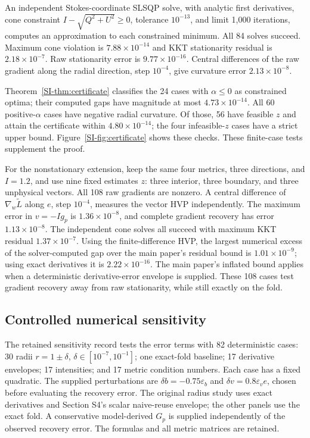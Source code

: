 An independent Stokes-coordinate SLSQP solve, with analytic first derivatives, cone constraint $I-\sqrt{Q^2+U^2}\geq0$, tolerance $10^{-13}$, and limit 1,000 iterations, computes an approximation to each constrained minimum. All 84 solves succeed. Maximum cone violation is $7.88\times10^{-14}$ and KKT stationarity residual is $2.18\times10^{-7}$. Raw stationarity error is $9.77\times10^{-16}$. Central differences of the raw gradient along the radial direction, step $10^{-4}$, give curvature error $2.13\times10^{-8}$.

Theorem~\ref{SI-thm:certificate} classifies the 24 cases with $\alpha\leq0$ as constrained optima; their computed gaps have magnitude at most $4.73\times10^{-14}$. All 60 positive-$\alpha$ cases have negative radial curvature. Of those, 56 have feasible $z$ and attain the certificate within $4.80\times10^{-14}$; the four infeasible-$z$ cases have a strict upper bound. Figure~\ref{SI-fig:certificate} shows these checks. These finite-case tests supplement the proof.

For the nonstationary extension, keep the same four metrics, three directions, and $I=1.2$, and use nine fixed estimates $z$: three interior, three boundary, and three unphysical vectors. All 108 raw gradients are nonzero. A central difference of $\nabla_w\widetilde L$ along $e$, step $10^{-4}$, measures the vector HVP independently. The maximum error in $v=-Ig_p$ is $1.36\times10^{-8}$, and complete gradient recovery has error $1.13\times10^{-8}$. The independent cone solves all succeed with maximum KKT residual $1.37\times10^{-7}$. Using the finite-difference HVP, the largest numerical excess of the solver-computed gap over the main paper's residual bound is $1.01\times10^{-9}$; using exact derivatives it is $2.22\times10^{-16}$. The main paper's inflated bound applies when a deterministic derivative-error envelope is supplied. These 108 cases test gradient recovery away from raw stationarity, while still exactly on the fold.




\subsection{Controlled numerical sensitivity}
The retained sensitivity record tests the error terms with 82 deterministic cases: 30 radii $r=1\pm\delta$, $\delta\in[10^{-7},10^{-1}]$; one exact-fold baseline; 17 derivative envelopes; 17 intensities; and 17 metric condition numbers. Each case has a fixed quadratic. The supplied perturbations are $\delta b=-0.75\varepsilon_b$ and $\delta v=0.8\varepsilon_ve$, chosen before evaluating the recovery error. The original radius study uses exact derivatives and Section S4's scalar naive-reuse envelope; the other panels use the exact fold. A conservative model-derived $G_p$ is supplied independently of the observed recovery error. The formulas and all metric matrices are retained.


